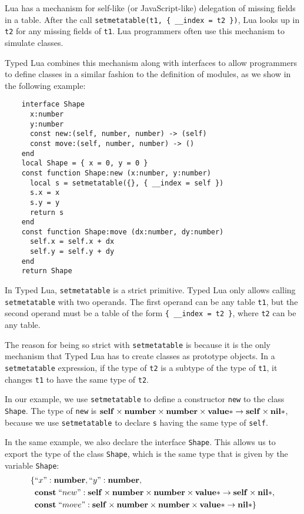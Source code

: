 Lua has a mechanism for self-like (or JavaScript-like) delegation of
missing fields in a table.
After the call \texttt{setmetatable(t1, \{ \string_\string_index = t2 \})},
Lua looks up in \texttt{t2} for any missing fields of \texttt{t1}.
Lua programmers often use this mechanism to simulate classes.

Typed Lua combines this mechanism along with interfaces to allow
programmers to define classes in a similar fashion to the definition
of modules, as we show in the following example:
\begin{verbatim}
    interface Shape
      x:number
      y:number
      const new:(self, number, number) -> (self)
      const move:(self, number, number) -> ()
    end
    local Shape = { x = 0, y = 0 }
    const function Shape:new (x:number, y:number)
      local s = setmetatable({}, { __index = self })
      s.x = x
      s.y = y
      return s
    end
    const function Shape:move (dx:number, dy:number)
      self.x = self.x + dx
      self.y = self.y + dy
    end
    return Shape
\end{verbatim}

In Typed Lua, \texttt{setmetatable} is a strict primitive.
Typed Lua only allows calling \texttt{setmetatable} with
two operands.
The first operand can be any table \texttt{t1}, but the second operand
must be a table of the form \texttt{\{ \string_\string_index = t2 \}},
where \texttt{t2} can be any table.

The reason for being so strict with \texttt{setmetatable} is because
it is the only mechanism that Typed Lua has to create classes
as prototype objects.
In a \texttt{setmetatable} expression, if the type of \texttt{t2}
is a subtype of the type of \texttt{t1}, it changes \texttt{t1} to
have the same type of \texttt{t2}.

In our example, we use \texttt{setmetatable} to define a constructor
\texttt{new} to the class \texttt{Shape}.
The type of \texttt{new} is
$\mathbf{self} \times \mathbf{number} \times \mathbf{number} \times \mathbf{value}{*} \rightarrow \mathbf{self} \times \mathbf{nil}{*}$,
because we use \texttt{setmetatable} to declare \texttt{s} having
the same type of \texttt{self}.

In the same example, we also declare the interface \texttt{Shape}.
This allows us to export the type of the class \texttt{Shape},
which is the same type that is given by the variable \texttt{Shape}:
\begin{align*}
\{ & ``x":\mathbf{number}, ``y":\mathbf{number},\\
& \mathbf{const} \; ``new":\mathbf{self} \times \mathbf{number} \times \mathbf{number} \times \mathbf{value}{*} \rightarrow \mathbf{self} \times \mathbf{nil}{*},\\
& \mathbf{const} \; ``move":\mathbf{self} \times \mathbf{number} \times \mathbf{number} \times \mathbf{value}{*} \rightarrow \mathbf{nil}{*}\}
\end{align*}

